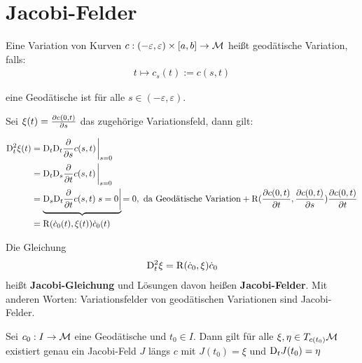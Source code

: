 \section{Jacobi-Felder}

\begin{defs}
Eine Variation von Kurven 
$c: (-\varepsilon, \varepsilon) \times [a , b] \to \mathcal{M}$
heißt geodätische Variation, falls:
\begin{align*}
    t \mapsto c_s(t) := c(s, t)
\end{align*}

eine Geodätische ist für alle $s\in (-\varepsilon, \varepsilon)$.
\end{defs}

Sei $\xi (t) = \pdv{c(0,t)}{s}$ das zugehörige Variationsfeld, dann gilt:

\begin{align*}
\covd^2_t \xi (t) &= \covd_t \covd_t \pdv{s} c(s, t) \eval_{s=0}\\
&= \covd_t \covd_s \pdv{t} c(s, t) \eval_{s=0}\\
&= \underbrace{\covd_s \covd_t \pdv{t} c(s, t) \eval{s=0}}
{=0, \ \text{da Geodätische Variation}} + 
\curv (\pdv{c(0, t)}{t} , \pdv{c(0, t)}{s}) \pdv{c(0,t)}{t}\\
&= \curv ( \dot{c}_0 (t) , \xi (t)) \dot{c}_0 (t)
\end{align*}

\begin{defs}
Die Gleichung
\begin{align}
\mathrm{D}^2_t \xi = \operatorname{R} (\dot{c}_0 , \xi ) \dot{c}_0
\end{align}
heißt \textbf{Jacobi-Gleichung} und Lösungen davon heißen
\textbf{Jacobi-Felder}.
Mit anderen Worten: Variationsfelder von geodätischen Variationen sind Jacobi-Felder.
\end{defs}

\begin{satz}
\label{satz:eindeutigkeitjacobi}
Sei $c_0 : I \to \mathcal{M}$ eine Geodätische und $t_0 \in I$.
Dann gilt für alle $\xi, \eta \in T_{c(t_0)}\mathcal{M}$ existiert genau ein Jacobi-Feld $J$ 
längs $c$ mit $J(t_0) = \xi$ und $\mathrm{D}_t J (t_0) = \eta$
\end{satz}

